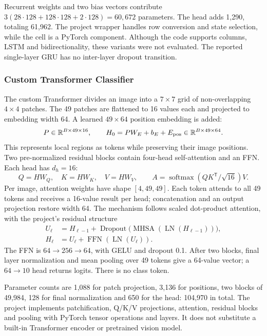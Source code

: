 Recurrent weights and two bias vectors contribute
\(3(28\cdot128+128\cdot128+2\cdot128)=60,672\) parameters.
The head adds 1,290, totaling 61,962. The project wrapper handles row conversion
and state selection, while the cell is a PyTorch component. Although the code
supports columns, LSTM and bidirectionality, these variants were not evaluated.
The reported single-layer GRU has no inter-layer dropout transition.

\subsubsection{Custom Transformer Classifier}
The custom Transformer divides an image into a \(7\times7\) grid of
non-overlapping \(4\times4\) patches. The 49 patches are flattened to 16 values
each and projected to embedding width 64. A learned \(49\times64\) position
embedding is added:
\[
 P\in\mathbb{R}^{B\times49\times16},\qquad
 H_0=PW_E+b_E+E_{\rm pos}\in\mathbb{R}^{B\times49\times64}.
\]
This represents local regions as tokens while preserving their image positions.
Two pre-normalized residual blocks contain four-head self-attention and an FFN.
Each head has \(d_h=16\):
\[
 Q=HW_Q,\quad K=HW_K,\quad V=HW_V,\qquad
 A=\operatorname{softmax}\!\left(QK^\mathsf{T}/\sqrt{16}\right)V.
\]
Per image, attention weights have shape \([4,49,49]\). Each token attends to all
49 tokens and receives a 16-value result per head; concatenation and an output
projection restore width 64. The mechanism follows scaled dot-product
attention,\citep{attention} with the project's residual structure
\begin{align*}
 U_\ell&=H_{\ell-1}+
 \operatorname{Dropout}\bigl(\operatorname{MHSA}(\operatorname{LN}(H_{\ell-1}))\bigr),\\
 H_\ell&=U_\ell+\operatorname{FFN}(\operatorname{LN}(U_\ell)).
\end{align*}
The FFN is \(64\to256\to64\), with GELU and dropout 0.1. After two blocks,
final layer normalization and mean pooling over 49 tokens give a 64-value vector;
a \(64\to10\) head returns logits. There is no class token.

Parameter counts are 1,088 for patch projection, 3,136 for positions,
two blocks of 49,984, 128 for final normalization and 650 for the head:
104,970 in total. The project implements patchification, Q/K/V projections,
attention, residual blocks and pooling with PyTorch tensor operations and layers.
It does not substitute a built-in Transformer encoder or pretrained vision model.
\FloatBarrier

